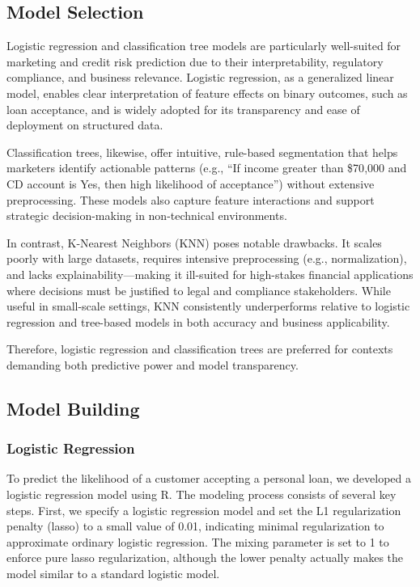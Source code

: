 \documentclass[12pt]{article}
\begin{document}
\subsection{Model Selection}
Logistic regression and classification tree models are particularly well-suited for marketing and credit risk prediction due to their interpretability, regulatory compliance, and business relevance. Logistic regression, as a generalized linear model, enables clear interpretation of feature effects on binary outcomes, such as loan acceptance, and is widely adopted for its transparency and ease of deployment on structured data.

Classification trees, likewise, offer intuitive, rule-based segmentation that helps marketers identify actionable patterns (e.g., ``If income greater than \$70{,}000 and CD account is Yes, then high likelihood of acceptance'') without extensive preprocessing. These models also capture feature interactions and support strategic decision-making in non-technical environments.

In contrast, K-Nearest Neighbors (KNN) poses notable drawbacks. It scales poorly with large datasets, requires intensive preprocessing (e.g., normalization), and lacks explainability---making it ill-suited for high-stakes financial applications where decisions must be justified to legal and compliance stakeholders. While useful in small-scale settings, KNN consistently underperforms relative to logistic regression and tree-based models in both accuracy and business applicability.

Therefore, logistic regression and classification trees are preferred for contexts demanding both predictive power and model transparency.
\subsection{Model Building}
\subsubsection{Logistic Regression}
To predict the likelihood of a customer accepting a personal loan, we developed a logistic regression model using \textsf{R}. The modeling process consists of several key steps. First, we specify a logistic regression model and set the L1 regularization penalty (lasso) to a small value of 0.01, indicating minimal regularization to approximate ordinary logistic regression. The mixing parameter is set to 1 to enforce pure lasso regularization, although the lower penalty actually makes the model similar to a standard logistic model.
\end{document}
